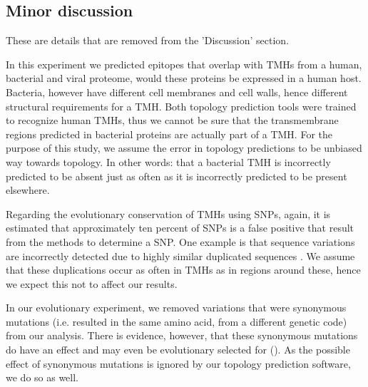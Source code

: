 \subsection{Minor discussion}

These are details that are removed from the 'Discussion' section.


In this experiment we predicted epitopes that overlap with 
TMHs from a human, bacterial and viral proteome,
would these proteins be expressed in a human host.
Bacteria, however have different cell membranes and cell walls, 
hence different structural requirements for a TMH.
Both topology prediction tools were trained to recognize
human TMHs, thus we cannot be sure that
the transmembrane regions predicted in bacterial proteins
are actually part of a TMH.
For the purpose of this study, we assume the 
error in topology predictions to be unbiased way towards topology.
In other words: that a bacterial TMH is incorrectly
predicted to be absent just as often as it is incorrectly
predicted to be present elsewhere.


Regarding the evolutionary conservation of TMHs using SNPs,
again, it is estimated that approximately ten percent
of SNPs is a false positive that result from the methods to determine
a SNP. One example is that sequence variations are incorrectly
detected due to highly similar duplicated sequences \cite{musumeci2010single}.
We assume that these duplications occur as often in TMHs as in
regions around these, hence we expect this not to affect our results.

%
In our evolutionary experiment, 
we removed variations that were synonymous mutations (i.e.
resulted in the same amino acid, from a different genetic code) 
from our analysis.
There is evidence, however, that these synonymous mutations
do have an effect and may even be evolutionary selected 
for (\cite{hunt2009silent}).
As the possible effect of synonymous mutations is ignored by our
topology prediction software, we do so as well.

